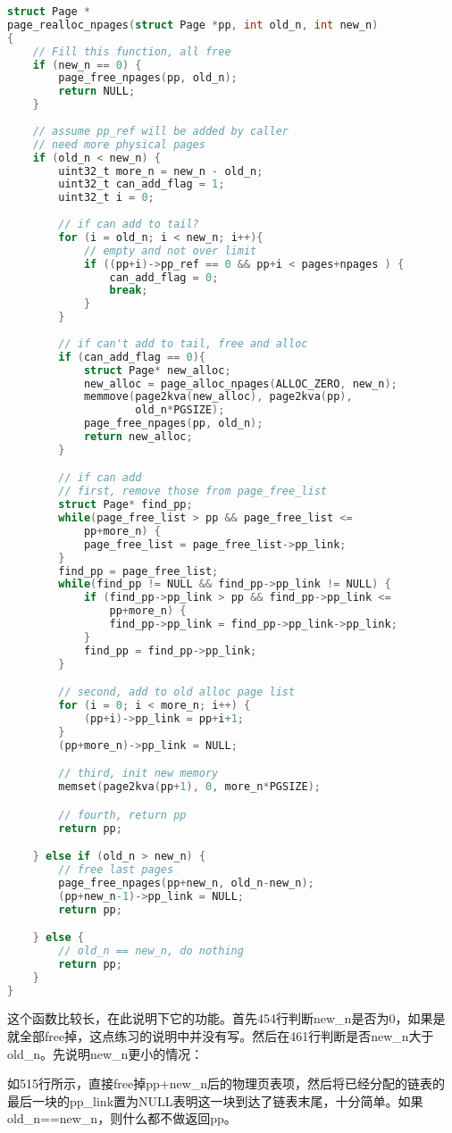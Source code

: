 \documentclass[11pt,a4paper]{article}
\begin{document}
\setmainfont{Consolas}
\begin{lstlisting}[language={C},firstnumber=450,title=kern/pmap.c]
struct Page *
page_realloc_npages(struct Page *pp, int old_n, int new_n)
{
	// Fill this function, all free
	if (new_n == 0) {
		page_free_npages(pp, old_n);
		return NULL;
	}
	
	// assume pp_ref will be added by caller 
	// need more physical pages
	if (old_n < new_n) {
		uint32_t more_n = new_n - old_n;
		uint32_t can_add_flag = 1;
		uint32_t i = 0;
	
		// if can add to tail?
		for (i = old_n; i < new_n; i++){
			// empty and not over limit 
			if ((pp+i)->pp_ref == 0 && pp+i < pages+npages ) {
				can_add_flag = 0;
				break;
			}
		}
		
		// if can't add to tail, free and alloc
		if (can_add_flag == 0){
			struct Page* new_alloc;
			new_alloc = page_alloc_npages(ALLOC_ZERO, new_n);
			memmove(page2kva(new_alloc), page2kva(pp),
					old_n*PGSIZE);
			page_free_npages(pp, old_n);
			return new_alloc;
		}

		// if can add
		// first, remove those from page_free_list
		struct Page* find_pp; 
		while(page_free_list > pp && page_free_list <= 
			pp+more_n) {
			page_free_list = page_free_list->pp_link;
		}
		find_pp = page_free_list;
		while(find_pp != NULL && find_pp->pp_link != NULL) {
			if (find_pp->pp_link > pp && find_pp->pp_link <= 
				pp+more_n) {
				find_pp->pp_link = find_pp->pp_link->pp_link;
			}
			find_pp = find_pp->pp_link;
		}

		// second, add to old alloc page list
		for (i = 0; i < more_n; i++) {
			(pp+i)->pp_link = pp+i+1;
		}
		(pp+more_n)->pp_link = NULL;

		// third, init new memory
		memset(page2kva(pp+1), 0, more_n*PGSIZE);

		// fourth, return pp
		return pp;

	} else if (old_n > new_n) {
		// free last pages
		page_free_npages(pp+new_n, old_n-new_n);
		(pp+new_n-1)->pp_link = NULL;
		return pp; 

	} else {
		// old_n == new_n, do nothing
		return pp;
	}
}
\end{lstlisting}
\setmainfont[BoldFont=黑体]{宋体}

这个函数比较长，在此说明下它的功能。首先454行判断new\_n是否为0，如果是就全部free掉，这点练习的说明中并没有写。然后在461行判断是否new\_n大于old\_n。先说明new\_n更小的情况：

如515行所示，直接free掉pp+new\_n后的物理页表项，然后将已经分配的链表的最后一块的pp\_link置为NULL表明这一块到达了链表末尾，十分简单。如果old\_n==new\_n，则什么都不做返回pp。
\end{document}
